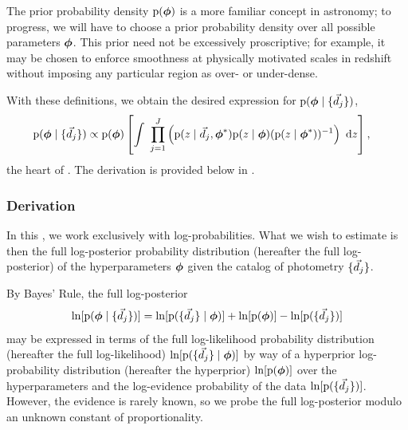 The prior probability density $\mathrm{p}({\boldsymbol{\phi}})$ is a more familiar concept in astronomy; to progress, we will have to choose a prior probability density over all possible parameters ${\boldsymbol{\phi}}$.
This prior need not be excessively proscriptive; for example, it may be chosen to enforce smoothness at physically motivated scales in redshift without imposing any particular region as over- or under-dense.

With these definitions, we obtain the desired expression for $\mathrm{p}({\boldsymbol{\phi}} \mid \{\vec{d}_{j}\})$,
\begin{align}
\begin{split}
\eqlabel{eqn:fullpost}
\pr{\ndphi \gvn \{\data_{j}\}} & \propto \pr{\ndphi}\left[\integral{\prod_{j=1}^{J} \left(\pr{z \gvn \data_{j}, \ndphi^{*}}\pr{z \gvn \ndphi}(\pr{z \gvn \ndphi^{*}})^{-1}\right)}{z}\right] ,
\end{split}
\end{align}
the heart of \Chippr.
The derivation is provided below in .

\subsubsection{Derivation}


In this \paper, we work exclusively with log-probabilities.  
What we wish to estimate is then the full log-posterior probability distribution (hereafter the full log-posterior) of the hyperparameters ${\boldsymbol{\phi}}$ given the catalog of photometry $\{\vec{d}_{j}\}$.

By Bayes' Rule, the full log-posterior
\begin{equation}
\eqlabel{eqn:basicbayes}
\ln[\pr{\ndphi \gvn \{\data_{j}\}}] = \ln[\pr{\{\data_{j}\} \gvn \ndphi}] + \ln[\pr{\ndphi}] - \ln[\pr{\{\data_{j}\}}]
\end{equation}
may be expressed in terms of the full log-likelihood probability distribution (hereafter the full log-likelihood) $\ln[\mathrm{p}(\{\vec{d}_{j}\} \mid {\ensuremath{\boldsymbol{\phi}}})]$ by way of a hyperprior log-probability distribution (hereafter the hyperprior) $\ln[\mathrm{p}({\boldsymbol{\phi}})]$ over the hyperparameters and the log-evidence probability of the data $\ln[\mathrm{p}(\{\vec{d}_{j}\})]$.
However, the evidence is rarely known, so we probe the full log-posterior modulo an unknown constant of proportionality.

